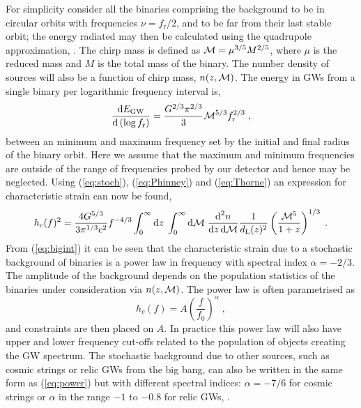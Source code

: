 For simplicity consider all the binaries comprising the background to be in circular orbits with frequencies $\nu=f_{\textrm{r}}/2$, and to be far from their last stable orbit; the energy radiated may then be calculated using the quadrupole approximation, \cite{petersmathews1963}. The chirp mass is defined as ${\cal{M}}=\mu^{3/5}M^{2/5}$, where $\mu$ is the reduced mass and $M$ is the total mass of the binary. The number density of sources will also be a function of chirp mass, $n(z,{\cal{M}})$. The energy in GWs from a single binary per logarithmic frequency interval is, 
\begin{equation}\label{eq:Thorne} \frac{\textrm{d}E_{\textrm{GW}}}{\textrm{d}\left(\log f_{\textrm{r}} \right)}=\frac{G^{2/3}\pi^{2/3}}{3}{\cal{M}}^{5/3}f_{\textrm{r}}^{2/3} \; , \end{equation}
between an minimum and maximum frequency set by the initial and final radius of the binary orbit. Here we assume that the maximum and minimum frequencies are outside of the range of frequencies probed by our detector and hence may be neglected. Using (\ref{eq:stoch}), (\ref{eq:Phinney}) and (\ref{eq:Thorne}) an expression for characteristic strain can now be found, \cite{SesanaVecchioColancino}
\begin{equation}\label{eq:bigint}
h_{c}(f)^{2}=\frac{4G^{5/3}}{3\pi^{1/3}c^{2}}f^{-4/3}\int_{0}^{\infty}\textrm{d}z\;\int_{0}^{\infty}\textrm{d}{\cal{M}}\;\frac{\textrm{d}^{2}n}{\textrm{d}z\,\textrm{d}{\cal{M}}}\frac{1}{d_{\textrm{L}}(z)^{2}}\left( \frac{{\cal{M}}^{5}}{1+z} \right)^{1/3}\; .
\end{equation}
From (\ref{eq:bigint}) it can be seen that the characteristic strain due to a stochastic background of binaries is a power law in frequency with spectral index $\alpha=-2/3$. The amplitude of the background depends on the population statistics of the binaries under consideration via $n(z,{\cal{M}})$. The power law is often parametrised as
\begin{equation}\label{eq:power} h_{c}(f)= A\left(\frac{f}{f_{0}}\right)^{\alpha}\; , \end{equation}
and constraints are then placed on $A$. In practice this power law will also have upper and lower frequency cut-offs related to the population of objects creating the GW spectrum. The stochastic background due to other sources, such as cosmic strings or relic GWs from the big bang, can also be written in the same form as (\ref{eq:power}) but with different spectral indices: $\alpha=-7/6$ for cosmic strings or $\alpha$ in the range $-1$ to $-0.8$ for relic GWs, \cite{Jenet}.




